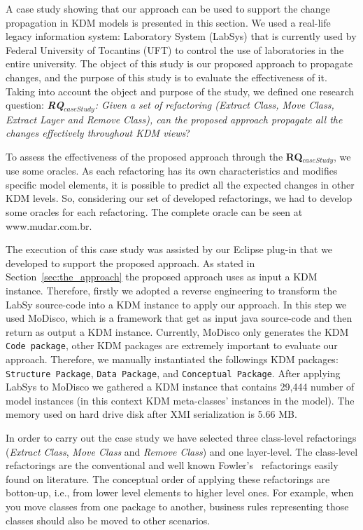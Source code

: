 
A case study showing that our approach can be used to support the change propagation in KDM models is presented in this section. We used a real-life legacy information system:  Laboratory System (LabSys) that is currently used by Federal University of Tocantins (UFT) to control the use of laboratories in the entire university. The object of this study is our proposed approach to propagate  changes, and the purpose of this study is to evaluate the  effectiveness of it. Taking into account the object and purpose of the study, we defined one research question:
\textit{ \textbf{RQ$_{caseStudy}$}: Given a set of refactoring (\textit{Extract Class}, \textit{Move Class}, \textit{Extract Layer} and \textit{Remove Class}), can the proposed approach propagate all the changes effectively throughout KDM views}?


To assess the effectiveness of the proposed approach through the \textbf{RQ$_{caseStudy}$}, we use some oracles. As each refactoring has its own characteristics and modifies specific model elements, it is possible to predict all the expected changes in other KDM levels. So, considering our set of developed refactorings, we had to develop some oracles for each refactoring. The complete oracle can be seen at www.mudar.com.br.

The execution of this case study was assisted by our Eclipse plug-in that we developed to support the proposed approach. As stated in Section~\ref{sec:the_approach} the proposed approach uses as input a KDM instance. Therefore, firstly we adopted a reverse engineering to  transform the LabSy source-code into a KDM instance to apply our approach. In this step we used MoDisco\cite{Brunele20141012}, which is a framework that get as input java source-code and then return as output a KDM instance. Currently, MoDisco only generates the KDM \texttt{Code package}, other KDM packages are extremely important to evaluate our approach. Therefore, we manually instantiated the followings KDM packages: \texttt{Structure Package}, \texttt{Data Package}, and \texttt{Conceptual Package}. After applying LabSys to MoDisco we gathered a KDM instance that contains 29,444 number of model instances (in this context KDM meta-classes' instances in the model). The memory used on hard drive disk after XMI serialization is 5.66 MB.


In order to carry out the case study we have selected three class-level refactorings (\textit{Extract Class}, \textit{Move Class} and \textit{Remove Class}) and one layer-level. The class-level refactorings are the conventional and well known Fowler's~\cite{refactImpro} refactorings easily found on literature. The conceptual order of applying these refactorings are botton-up, i.e., from lower level elements to higher level ones. For example, when you move classes from one package to another, business rules representing those classes should also be moved to other scenarios.
        
